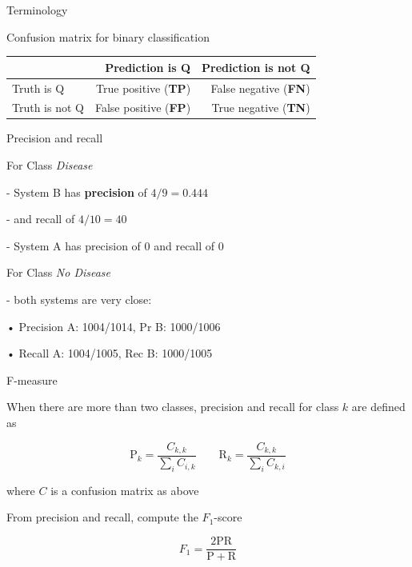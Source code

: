 \documentclass[12pt]{beamer}
\begin{document}
\begin{frame}{Terminology}
	
	Confusion matrix for binary classification
	
	\begin{table}
		\begin{footnotesize}
			\begin{tabular}{l|rr}
				& Prediction is Q & Prediction is not Q \\ \hline
				Truth is Q & True positive (\textbf{TP}) & False negative (\textbf{FN}) \\
				Truth is not Q & False positive (\textbf{FP}) & True negative (\textbf{TN}) 
			\end{tabular}
		\end{footnotesize}
	\end{table}
	
	
\end{frame}




\begin{frame}{Precision and recall}
	
For Class \emph{Disease}

- System B has \textbf{precision} of $4/9 = 0.444$

- and recall of $4/10 = 40$

- System A has precision of $0$ and recall of $0$

\bigskip

For Class \emph{No Disease}

- both systems are very close:

• Precision A: 1004/1014, Pr B: 1000/1006

• Recall A: 1004/1005, Rec B: 1000/1005

\end{frame}

\begin{frame}{F-measure}
	
When there are more than two classes, precision and recall for class $k$ are defined as

$$
\mathrm{P}_k = \frac{C_{k,k}}{ \sum_{i} C_{i,k}}
\qquad
\mathrm{R}_k =  \frac{C_{k,k}}{ \sum_{i} C_{k,i}}
$$

where $C$ is a confusion matrix as above

\bigskip

From precision and recall, compute the $F_1$-score 

$$
F_1 = \frac{2 \mathrm{P} \mathrm{R}}{\mathrm{P} + \mathrm{R}}
$$

	
\end{frame}
\end{document}
